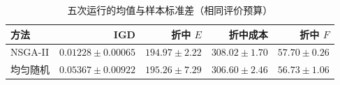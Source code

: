 \begin{table}[htbp]
  \centering
  \caption{五次运行的均值与样本标准差（相同评价预算）}
  \label{tab:replicates}
  \begin{tabular}{@{}lrrrr@{}}
    \toprule
    方法 & IGD & 折中 $E$ & 折中成本 & 折中 $F$\\
    \midrule
    NSGA-II & $0.01228\pm0.00065$ & $194.97\pm2.22$ & $308.02\pm1.70$ & $57.70\pm0.26$\\
    均匀随机 & $0.05367\pm0.00922$ & $195.26\pm7.29$ & $306.60\pm2.46$ & $56.73\pm1.06$\\
    \bottomrule
  \end{tabular}
\end{table}
